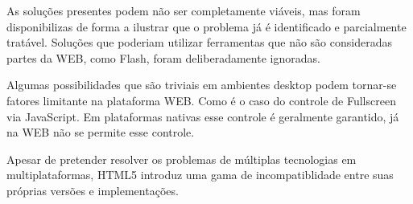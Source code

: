 As soluções presentes podem não ser completamente viáveis, mas foram
disponibilizas de forma a ilustrar que o problema já é identificado e
parcialmente tratável. Soluções que poderiam utilizar ferramentas que
não são consideradas partes da WEB, como Flash, foram deliberadamente
ignoradas.

Algumas possibilidades que são triviais em ambientes desktop podem tornar-se fatores limitante
na plataforma WEB. Como é o caso do controle de Fullscreen via JavaScript. Em plataformas nativas
esse controle é geralmente garantido, já na WEB não se permite esse controle. %

Apesar de pretender resolver os problemas de múltiplas tecnologias em
multiplataformas, HTML5 introduz uma gama de incompatiblidade entre suas
próprias versões e implementações.
